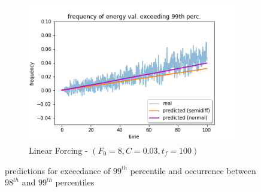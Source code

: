 \documentclass{article}
\begin{document}
\begin{figure}[!ht]
\begin{subfigure}[b]{0.48\textwidth}
		\includegraphics[width=1\linewidth]{fig/pred_energy_exceed_099q_L_003_100.png}
		\caption{Linear Forcing - $(F_0=8, C=0.03, t_f=100)$}
		\label{fig:pred_energy_exceed_099q_L_003_100}
	\end{subfigure}
	\caption{predictions for exceedance of $99^{th}$ percentile and occurrence between $98^{th}$ and $99^{th}$ percentiles}
	\label{fig:pred_energy_exceed_099q}
\end{figure}
\end{document}
